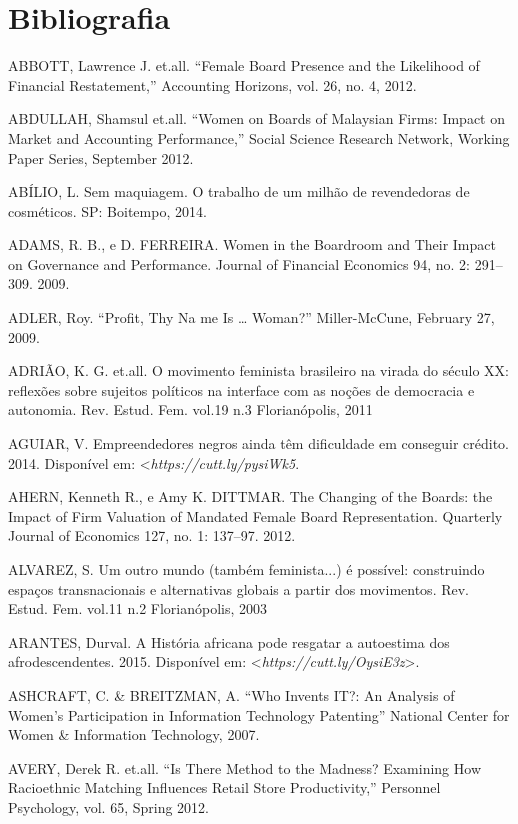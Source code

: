 \chapter{Bibliografia}

\begin{Parskip}
ABBOTT, Lawrence J. et.all. ``Female Board Presence and the Likelihood
of Financial Restatement,'' Accounting Horizons, vol. 26, no. 4, 2012.

ABDULLAH, Shamsul et.all. ``Women on Boards of Malaysian Firms: Impact
on Market and Accounting Performance,'' Social Science Research Network,
Working Paper Series, September 2012.

ABÍLIO, L. Sem maquiagem. O trabalho de um milhão de revendedoras de
cosméticos. SP: Boitempo, 2014.

ADAMS, R. B., e D. FERREIRA. Women in the Boardroom and Their Impact on
Governance and Performance. Journal of Financial Economics 94, no. 2:
291--309. 2009.

ADLER, Roy. ``Profit, Thy Na me Is \ldots{} Woman?'' Miller-McCune,
February 27, 2009.

ADRIÃO, K. G. et.all. O movimento feminista brasileiro na virada do
século XX: reflexões sobre sujeitos políticos na interface com as noções
de democracia e autonomia. Rev. Estud. Fem. vol.19 n.3 Florianópolis,
2011

AGUIAR, V. Empreendedores negros ainda têm dificuldade em conseguir
crédito. 2014.
Disponível em: \textless\emph{https://cutt.ly/pysiWk5}\textgreate{}.

AHERN, Kenneth R., e Amy K. DITTMAR. The Changing of the Boards: the
Impact of Firm Valuation of Mandated Female Board Representation.
Quarterly Journal of Economics 127, no. 1: 137--97. 2012.

ALVAREZ, S. Um outro mundo (também feminista...) é possível: construindo
espaços transnacionais e alternativas globais a partir dos movimentos.
Rev. Estud. Fem. vol.11 n.2 Florianópolis, 2003

ARANTES, Durval. A História africana pode resgatar a autoestima dos
afrodescendentes. 2015.
Disponível em: \textless{}\emph{https://cutt.ly/OysiE3z}\textgreater{}.

ASHCRAFT, C. \& BREITZMAN, A. ``Who Invents IT?: An Analysis of Women's
Participation in Information Technology Patenting'' National Center for
Women \& Information Technology, 2007.

AVERY, Derek R. et.all. ``Is There Method to the Madness? Examining How
Racioethnic Matching Influences Retail Store Productivity,'' Personnel
Psychology, vol. 65, Spring 2012.


\end{Parskip}
